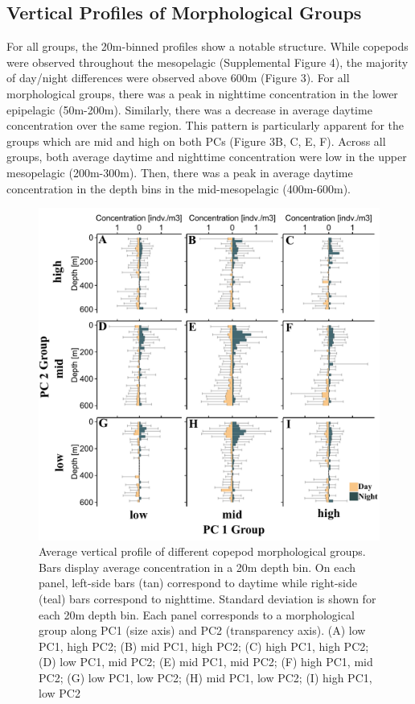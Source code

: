 \documentclass[
  letterpaper,
  DIV=11,
  numbers=noendperiod]{scrartcl}
\begin{document}
\hypertarget{vertical-profiles-of-morphological-groups}{%
\subsection{Vertical Profiles of Morphological
Groups}\label{vertical-profiles-of-morphological-groups}}

For all groups, the 20m-binned profiles show a notable structure. While
copepods were observed throughout the mesopelagic (Supplemental Figure
4), the majority of day/night differences were observed above 600m
(Figure 3). For all morphological groups, there was a peak in nighttime
concentration in the lower epipelagic (50m-200m). Similarly, there was a
decrease in average daytime concentration over the same region. This
pattern is particularly apparent for the groups which are mid and high
on both PCs (Figure 3B, C, E, F). Across all groups, both average
daytime and nighttime concentration were low in the upper mesopelagic
(200m-300m). Then, there was a peak in average daytime concentration in
the depth bins in the mid-mesopelagic (400m-600m).

\begin{figure}

{\centering \includegraphics{../media/figure_03.pdf}

}

\caption{Average vertical profile of different copepod morphological
groups. Bars display average concentration in a 20m depth bin. On each
panel, left-side bars (tan) correspond to daytime while right-side
(teal) bars correspond to nighttime. Standard deviation is shown for
each 20m depth bin. Each panel corresponds to a morphological group
along PC1 (size axis) and PC2 (transparency axis). (A) low PC1, high
PC2; (B) mid PC1, high PC2; (C) high PC1, high PC2; (D) low PC1, mid
PC2; (E) mid PC1, mid PC2; (F) high PC1, mid PC2; (G) low PC1, low PC2;
(H) mid PC1, low PC2; (I) high PC1, low PC2}

\end{figure}
\end{document}
